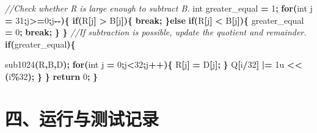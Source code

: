 \documentclass[11pt,a4paper]{ctexart}
\newenvironment{Shaded}{\begin{snugshade}}{\end{snugshade}}
\newcommand{\BuiltInTok}[1]{#1}
\newcommand{\CommentTok}[1]{\textcolor[rgb]{0.56,0.35,0.01}{\textit{#1}}}
\newcommand{\ControlFlowTok}[1]{\textcolor[rgb]{0.13,0.29,0.53}{\textbf{#1}}}
\newcommand{\DataTypeTok}[1]{\textcolor[rgb]{0.13,0.29,0.53}{#1}}
\newcommand{\DecValTok}[1]{\textcolor[rgb]{0.00,0.00,0.81}{#1}}
\newcommand{\NormalTok}[1]{#1}
\newcommand{\OperatorTok}[1]{\textcolor[rgb]{0.81,0.36,0.00}{\textbf{#1}}}
\renewenvironment{Shaded}{\begin{snugshade}}{\end{snugshade}}
\begin{document}
\begin{Shaded}
\begin{Highlighting}[]
        \CommentTok{//Check whether R is large enough to subtract B.}
        \DataTypeTok{int}\NormalTok{ greater\_equal }\OperatorTok{=} \DecValTok{1}\OperatorTok{;}
        \ControlFlowTok{for}\OperatorTok{(}\DataTypeTok{int}\NormalTok{ j }\OperatorTok{=} \DecValTok{31}\OperatorTok{;}\NormalTok{j}\OperatorTok{\textgreater{}=}\DecValTok{0}\OperatorTok{;}\NormalTok{j}\OperatorTok{{-}{-})\{}
            \ControlFlowTok{if}\OperatorTok{(}\NormalTok{R}\OperatorTok{[}\NormalTok{j}\OperatorTok{]} \OperatorTok{\textgreater{}}\NormalTok{ B}\OperatorTok{[}\NormalTok{j}\OperatorTok{])\{}
                \ControlFlowTok{break}\OperatorTok{;}
            \OperatorTok{\}}\ControlFlowTok{else} \ControlFlowTok{if}\OperatorTok{(}\NormalTok{R}\OperatorTok{[}\NormalTok{j}\OperatorTok{]} \OperatorTok{\textless{}}\NormalTok{ B}\OperatorTok{[}\NormalTok{j}\OperatorTok{])\{}
\NormalTok{                greater\_equal }\OperatorTok{=} \DecValTok{0}\OperatorTok{;}
                \ControlFlowTok{break}\OperatorTok{;}
            \OperatorTok{\}}
        \OperatorTok{\}}
        \CommentTok{//If subtraction is possible, update the quotient and remainder.}
        \ControlFlowTok{if}\OperatorTok{(}\NormalTok{greater\_equal}\OperatorTok{)\{}
            
\NormalTok{            sub1024}\OperatorTok{(}\NormalTok{R}\OperatorTok{,}\NormalTok{B}\OperatorTok{,}\NormalTok{D}\OperatorTok{);}
            \ControlFlowTok{for}\OperatorTok{(}\DataTypeTok{int}\NormalTok{ j }\OperatorTok{=} \DecValTok{0}\OperatorTok{;}\NormalTok{j}\OperatorTok{\textless{}}\DecValTok{32}\OperatorTok{;}\NormalTok{j}\OperatorTok{++)\{}
\NormalTok{                R}\OperatorTok{[}\NormalTok{j}\OperatorTok{]} \OperatorTok{=}\NormalTok{ D}\OperatorTok{[}\NormalTok{j}\OperatorTok{];}
            \OperatorTok{\}}
\NormalTok{            Q}\OperatorTok{[}\NormalTok{i}\OperatorTok{/}\DecValTok{32}\OperatorTok{]} \OperatorTok{|=} \DecValTok{1}\BuiltInTok{u} \OperatorTok{\textless{}\textless{}} \OperatorTok{(}\NormalTok{i}\OperatorTok{\%}\DecValTok{32}\OperatorTok{);}
        \OperatorTok{\}}
    \OperatorTok{\}}
    \ControlFlowTok{return} \DecValTok{0}\OperatorTok{;}
\OperatorTok{\}}
\end{Highlighting}
\end{Shaded}

\FloatBarrier

\hypertarget{ux56dbux8fd0ux884cux4e0eux6d4bux8bd5ux8bb0ux5f55}{%
\section{四、运行与测试记录}\label{ux56dbux8fd0ux884cux4e0eux6d4bux8bd5ux8bb0ux5f55}}
\end{document}
